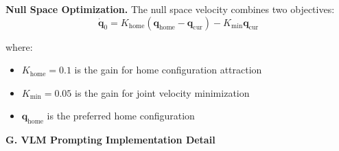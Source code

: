 \noindent \textbf{Null Space Optimization.} The null space velocity combines two objectives:
\[
    \dot{\mathbf{q}}_0 = K_{\text{home}}\left(\mathbf{q}_{\text{home}} - \mathbf{q}_{\text{cur}}\right) - K_{\text{min}}\mathbf{q}_{\text{cur}}
\]

\noindent where:
\begin{itemize}
    \item $K_{\text{home}} = 0.1$ is the gain for home configuration attraction
    \item $K_{\text{min}} = 0.05$ is the gain for joint velocity minimization
    \item $\mathbf{q}_{\text{home}}$ is the preferred home configuration
\end{itemize}

\newpage




\noindent \textbf{G. VLM Prompting Implementation Detail}


